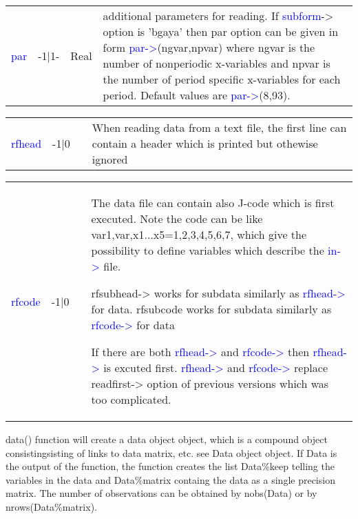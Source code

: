 \vspace{-1.51em}
\begin{table}[H]
\begin{tabular}{ m{}  m{}m{}p{}}
 \textcolor{blue}{par}&-1|1-& Real&additional parameters for reading. If \textcolor{blue}{subform}-> option is 'bgaya' then par
 option can be given in form \textcolor{blue}{par->}(ngvar,npvar) where ngvar is the number
 of nonperiodic x-variables and npvar is the number of period specific x-variables
 for each period. Default values are \textcolor{blue}{par->}(8,93).

\\ \cline{1-4}
\end{tabular}
\end{table}
\vspace{-1.51em}
\begin{table}[H]
\begin{tabular}{ m{}  m{}m{}p{}}
 \textcolor{blue}{rfhead} &-1|0& & When reading data from a text file, the first line can contain a header which is
printed but othewise ignored

\\ \cline{1-4}
\end{tabular}
\end{table}
\vspace{-1.51em}
\begin{table}[H]
\begin{tabular}{ m{}  m{}m{}p{}}
 \textcolor{blue}{rfcode} &-1|0& &The data file can contain also J-code which is first executed. Note the code can
 be like var1,var,x1...x5=1,2,3,4,5,6,7, which give the possibility to
 define variables which describe the \textcolor{blue}{in->} file.


 rfsubhead-> works for subdata similarly as \textcolor{blue}{rfhead->} for data.
 rfsubcode works for subdata similarly as \textcolor{blue}{rfcode->} for data

 If there are both \textcolor{blue}{rfhead->} and \textcolor{blue}{rfcode->} then \textcolor{blue}{rfhead->} is excuted first.
 \textcolor{blue}{rfhead->} and \textcolor{blue}{rfcode->} replace readfirst-> option  of previous versions which was too
 complicated.
\\ \cline{1-4}
\end{tabular}
\end{table}
\begin{note}
\textcolor{VioletRed}{data}() function will create a data object object, which is a compound object consistingsisting
 of links to data matrix, etc. see Data object object. If Data is the output
 of the function, the function creates the list Data\%keep telling the
 variables in the data and
 Data\%matrix containg the data as a single precision matrix. The number of observations can be obtained by \textcolor{VioletRed}{nobs}(Data) or by
 \textcolor{VioletRed}{nrows}(Data\%matrix).
\end{note}
